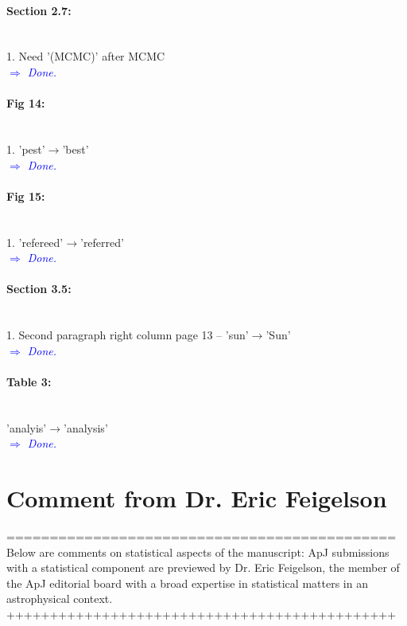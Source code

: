 \documentclass[10pt,a4paper]{article}
\newcommand{\Comment}[1]{\textsl{\textcolor{Blue}{$\Longrightarrow$ {#1}}}}
\begin{document}
\paragraph{Section 2.7:} \hspace{1cm}\\1. Need '(MCMC)' after MCMC \\\Comment{Done.}

\paragraph{Fig 14:} \hspace{1cm}\\1. 'pest'$\rightarrow$'best' \\\Comment{Done.}

\paragraph{Fig 15:} \hspace{1cm}\\1. 'refereed'$\rightarrow$'referred'  \\\Comment{Done.}

\paragraph{Section 3.5:} \hspace{1cm}\\1. Second paragraph right column page 13 -- 'sun'$\rightarrow$'Sun' \\\Comment{Done.}

\paragraph{Table 3:} \hspace{1cm}\\'analyis'$\rightarrow$'analysis'  \\\Comment{Done.}

\section{Comment from Dr. Eric Feigelson}


=============================================\\
Below are comments on statistical aspects of the manuscript: ApJ submissions with a
statistical component are previewed by Dr. Eric Feigelson, the member of the ApJ
editorial board with a broad expertise in statistical matters in an astrophysical
context.\\
+++++++++++++++++++++++++++++++++++++++++++++\\\\
\end{document}
